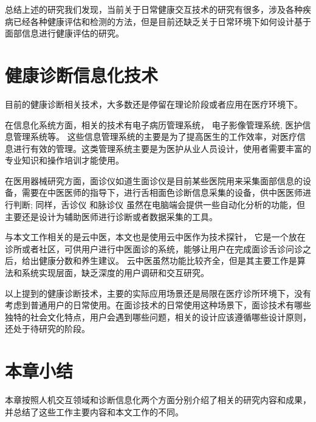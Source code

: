 总结上述的研究我们发现，当前关于日常健康交互技术的研究有很多，涉及各种疾病已经各种健康评估和检测的方法，但是目前还缺乏关于日常环境下如何设计基于面部信息进行健康评估的研究。

\section{健康诊断信息化技术}

目前的健康诊断相关技术，大多数还是停留在理论阶段或者应用在医疗环境下。

在信息化系统方面，相关的技术有电子病历管理系统\cite{高春芳2013电子病历系统应用现状及前景展望}， 电子影像管理系统\cite{张安平2018医院信息管理系统的电子病历和医学影像系统分析}, 医护信息管理系统\cite{虞正红2018医护合作静脉血栓栓塞管理信息化平台的设计与应用}等。
这些信息管理系统的主要是为了提高医生的工作效率，对医疗信息进行有效的管理。这类管理系统主要是为医护从业人员设计，使用者需要丰富的专业知识和操作培训才能使用。

在医用器械研究方面，面诊仪如道生面诊仪\cite{邸丹2016手持式舌象仪的研制}是目前某些医院用来采集面部信息的设备，需要在中医医师的指导下，进行舌相面色诊断信息采集的设备，供中医医师进行判断;
 同样，舌诊仪\cite{李丹溪2017舌诊仪的发展及其在舌诊客观化研究中的应用现状} 和脉诊仪 \cite{牛婷婷2017脉诊仪}虽然在电脑端会提供一些自动化分析的功能，但主要还是设计为辅助医师进行诊断或者数据采集的工具。
 
 与本文工作相关的是云中医\cite{Zhang2018Study}，本文也是使用云中医作为技术探针\cite{Hutchinson2003Technology}， 它是一个放在诊所或者社区，可供用户进行中医面诊的系统，能够让用户在完成面诊舌诊问诊之后，给出健康分数和养生建议。
 云中医虽然功能比较齐全，但是其主要工作是算法和系统实现层面，缺乏深度的用户调研和交互研究。

以上提到的健康诊断技术，主要的实际应用场景还是局限在医疗诊所环境下，没有考虑到普通用户的日常使用。在面诊技术的日常使用这种场景下，面诊技术有哪些独特的社会文化特点，用户会遇到哪些问题，相关的设计应该遵循哪些设计原则，还处于待研究的阶段。

\section{本章小结}
本章按照人机交互领域和诊断信息化两个方面分别介绍了相关的研究内容和成果，并总结了这些工作主要内容和本文工作的不同。